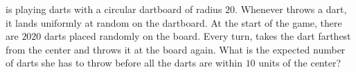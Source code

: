  is playing darts with a circular dartboard of radius $20$. Whenever  throws a dart, it lands uniformly at random on the dartboard. At the start of the game, there are $2020$ darts placed randomly on the board. Every turn,  takes the dart farthest from the center and throws it at the board again. What is the expected number of darts she has to throw before all the darts are within $10$ units of the center?
